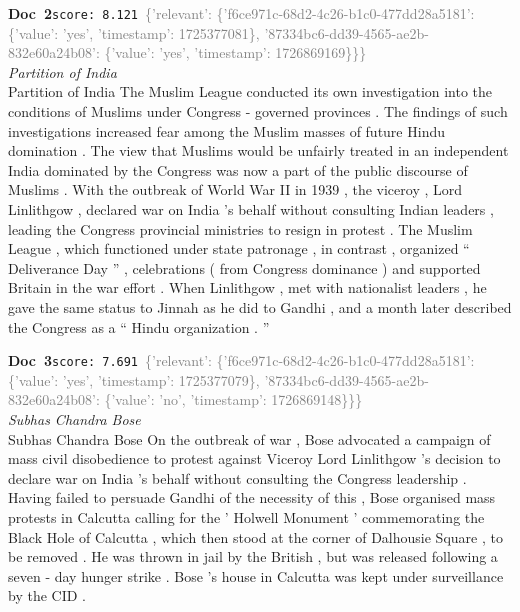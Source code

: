 \documentclass[a4paper,11pt]{article}
\begin{document}
\begin{docenv}
{\footnotesize\textcolor{doccolor}{\textbf{Doc~2}}}\hfill{\tiny\texttt{score:~8.121}}\ {\tiny\textcolor{gray}{\{'relevant': \{'f6ce971c-68d2-4c26-b1c0-477dd28a5181': \{'value': 'yes', 'timestamp': 1725377081\}, '87334bc6-dd39-4565-ae2b-832e60a24b08': \{'value': 'yes', 'timestamp': 1726869169\}\}\}}}\\[3pt]
{\small\textit{Partition of India}}\\[2pt]
\vspace{2pt}
{\footnotesize Partition of India
The Muslim League conducted its own investigation into the conditions of Muslims under Congress - governed provinces . The findings of such investigations increased fear among the Muslim masses of future Hindu domination . The view that Muslims would be unfairly treated in an independent India dominated by the Congress was now a part of the public discourse of Muslims . With the outbreak of World War II in 1939 , the viceroy , Lord Linlithgow , declared war on India 's behalf without consulting Indian leaders , leading the Congress provincial ministries to resign in protest . The Muslim League , which functioned under state patronage , in contrast , organized `` Deliverance Day '' , celebrations ( from Congress dominance ) and supported Britain in the war effort . When Linlithgow , met with nationalist leaders , he gave the same status to Jinnah as he did to Gandhi , and a month later described the Congress as a `` Hindu organization . ''}
\end{docenv}
\begin{docenv}
{\footnotesize\textcolor{doccolor}{\textbf{Doc~3}}}\hfill{\tiny\texttt{score:~7.691}}\ {\tiny\textcolor{gray}{\{'relevant': \{'f6ce971c-68d2-4c26-b1c0-477dd28a5181': \{'value': 'yes', 'timestamp': 1725377079\}, '87334bc6-dd39-4565-ae2b-832e60a24b08': \{'value': 'no', 'timestamp': 1726869148\}\}\}}}\\[3pt]
{\small\textit{Subhas Chandra Bose}}\\[2pt]
\vspace{2pt}
{\footnotesize Subhas Chandra Bose
On the outbreak of war , Bose advocated a campaign of mass civil disobedience to protest against Viceroy Lord Linlithgow 's decision to declare war on India 's behalf without consulting the Congress leadership . Having failed to persuade Gandhi of the necessity of this , Bose organised mass protests in Calcutta calling for the ' Holwell Monument ' commemorating the Black Hole of Calcutta , which then stood at the corner of Dalhousie Square , to be removed . He was thrown in jail by the British , but was released following a seven - day hunger strike . Bose 's house in Calcutta was kept under surveillance by the CID .}
\end{docenv}
\end{document}
